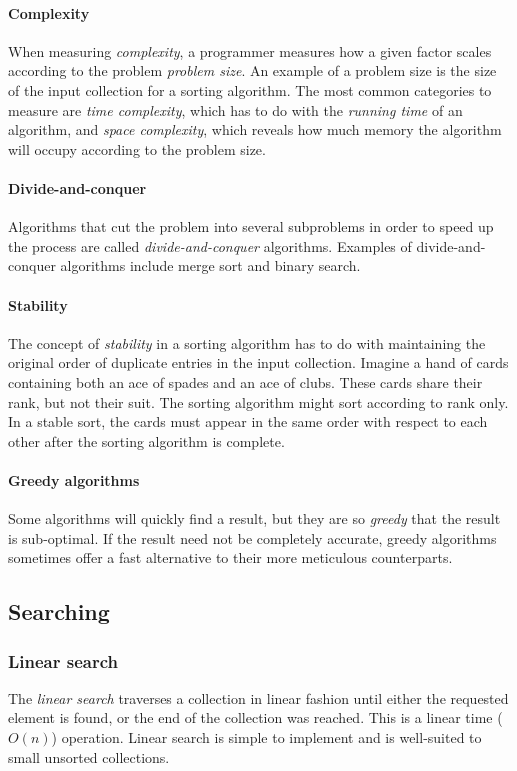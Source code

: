 \documentclass{article}
\begin{document}
\paragraph{Complexity}
When measuring {\em complexity}, a programmer measures how a given factor scales according to the problem {\em problem size}.
An example of a problem size is the size of the input collection for a sorting algorithm. The most common categories to measure
are {\em time complexity}, which has to do with the {\em running time} of an algorithm, and {\em space complexity}, which reveals
how much memory the algorithm will occupy according to the problem size.

\paragraph{Divide-and-conquer}
Algorithms that cut the problem into several subproblems in order to speed up the process are called {\em divide-and-conquer}
algorithms. Examples of divide-and-conquer algorithms include merge sort and binary search.

\paragraph{Stability}
The concept of {\em stability} in a sorting algorithm has to do with maintaining the original order of duplicate entries in the
input collection. Imagine a hand of cards containing both an ace of spades and an ace of clubs. These cards share their rank, but
not their suit. The sorting algorithm might sort according to rank only. In a stable sort, the cards must appear in the same
order with respect to each other after the sorting algorithm is complete.

\paragraph{Greedy algorithms}
Some algorithms will quickly find a result, but they are so {\em greedy} that the result is sub-optimal. If the result need
not be completely accurate, greedy algorithms sometimes offer a fast alternative to their more meticulous counterparts.


\subsection{Searching}
\subsubsection{Linear search}
The {\em linear search} traverses a collection in linear fashion until either the requested element is found,
or the end of the collection was reached. This is a linear time (\(O(n)\)) operation.
Linear search is simple to implement and is well-suited to small unsorted collections.
\end{document}
